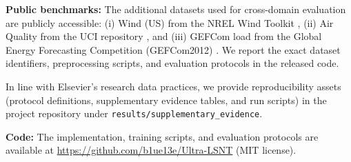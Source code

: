 \documentclass[review,1p,times]{elsarticle}
\begin{document}
\textbf{Public benchmarks:} The additional datasets used for cross-domain evaluation are publicly accessible: (i) Wind (US) from the NREL Wind Toolkit \cite{draxl2015windtoolkit}, (ii) Air Quality from the UCI repository \cite{devito2008}, and (iii) GEFCom load from the Global Energy Forecasting Competition (GEFCom2012) \cite{Hong2014GEFCom2012}. We report the exact dataset identifiers, preprocessing scripts, and evaluation protocols in the released code.

In line with Elsevier's research data practices, we provide reproducibility assets (protocol definitions, supplementary evidence tables, and run scripts) in the project repository under \texttt{results/supplementary\_evidence}.

\textbf{Code:} The implementation, training scripts, and evaluation protocols are available at \url{https://github.com/b1ue13e/Ultra-LSNT} (MIT license).

\appendix
\end{document}
